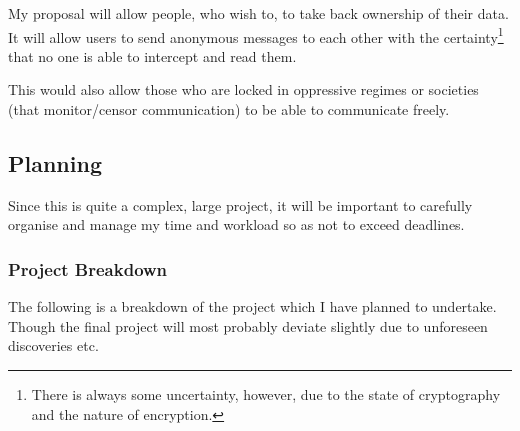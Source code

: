 \documentclass{article}
\begin{document}
My proposal will allow people, who wish to, to take back ownership of their data. It will allow users to send anonymous messages to each other with the certainty\footnote{There is always some uncertainty, however, due to the state of cryptography and the nature of encryption.} that no one is able to intercept and read them.

This would also allow those who are locked in oppressive regimes or societies (that monitor/censor communication) to be able to communicate freely.

\newpage
\subsection{Planning}
Since this is quite a complex, large project, it will be important to carefully organise and manage my time and workload so as not to exceed deadlines.

\subsubsection{Project Breakdown}
The following is a breakdown of the project which I have planned to undertake. Though the final project will most probably deviate slightly due to unforeseen discoveries etc.
\end{document}
